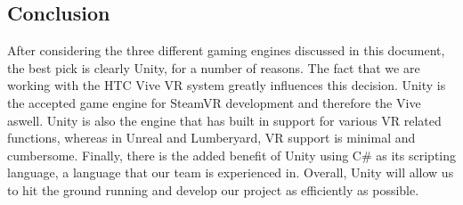 \documentclass[10pt,journal,compsoc,onecolumn, draftclsnofoot]{IEEEtran}
\begin{document}
\begin{bibunit}
\section{Conclusion}
After considering the three different gaming engines discussed in this document, the best pick is clearly Unity, for a number of reasons.
The fact that we are working with the HTC Vive VR system greatly influences this decision.
Unity is the accepted game engine for SteamVR development and therefore the Vive aswell.
Unity is also the engine that has built in support for various VR related functions, whereas in Unreal and Lumberyard, VR support is minimal and cumbersome.
Finally, there is the added benefit of Unity using C\# as its scripting language, a language that our team is experienced in.
Overall, Unity will allow us to hit the ground running and develop our project as efficiently as possible.

% 
\putbib[techreview]
\end{bibunit}
\end{document}

